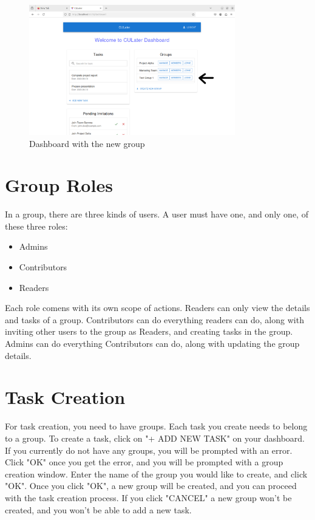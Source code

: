 \documentclass{scrreprt}
\begin{document}
\begin{figure}[htbp]
        \centering
        \includegraphics[width=0.8\textwidth]{added_new_group_dashboard.png}
	\caption{Dashboard with the new group}
	\label{fig:my_label}
\end{figure}

\chapter{Group Roles}
In a group, there are three kinds of users. A user must have one, and only one, of these three roles:

\begin{itemize}
	\item Admins
	\item Contributors
	\item Readers
\end{itemize}

Each role comens with its own scope of actions. Readers can only view the details and tasks of a group. Contributors can do everything readers can do, along with inviting other users to the group as Readers, and creating tasks in the group. Admins can do everything Contributors can do, along with updating the group details.

\chapter{Task Creation}

For task creation, you need to have groups. Each task you create needs to belong to a group. To create a task, click on "+ ADD NEW TASK" on your dashboard. If you currently do not have any groups, you will be prompted with an error. Click "OK" once you get the error, and you will be prompted with a group creation window. Enter the name of the group you would like to create, and click "OK". Once you click "OK", a new group will be created, and you can proceed with the task creation process. If you click "CANCEL" a new group won't be created, and you won't be able to add a new task.\\
\end{document}
